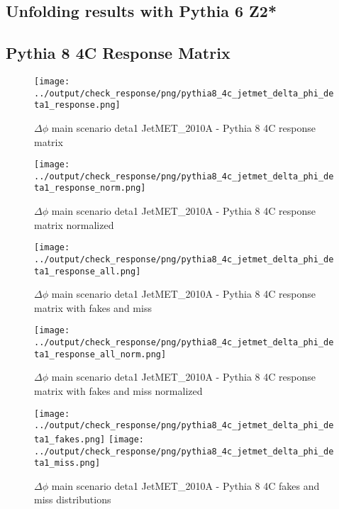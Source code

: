 \documentclass[11pt]{book}
\begin{document}
\clearpage
\subsection{Unfolding results with Pythia 6 Z2*}


\clearpage
\subsection{Pythia 8 4C Response Matrix}


\begin{figure}[ht]
\centering
\texttt{[image: ../output/check\_response/png/pythia8\_4c\_jetmet\_delta\_phi\_deta1\_response.png]}
\caption{$\Delta\phi$ main scenario deta1 JetMET\_2010A - Pythia 8 4C response matrix}
\label{p8_jetmet_response}
\end{figure}

\begin{figure}[ht]
\centering
\texttt{[image: ../output/check\_response/png/pythia8\_4c\_jetmet\_delta\_phi\_deta1\_response\_norm.png]}
\caption{$\Delta\phi$ main scenario deta1 JetMET\_2010A - Pythia 8 4C response matrix normalized}
\label{p8_jetmet_delta_phi_deta1_response_norm}
\end{figure}

\begin{figure}[ht]
\centering
\texttt{[image: ../output/check\_response/png/pythia8\_4c\_jetmet\_delta\_phi\_deta1\_response\_all.png]}
\caption{$\Delta\phi$ main scenario deta1 JetMET\_2010A - Pythia 8 4C response matrix with fakes and miss}
\label{p8_jetmet_delta_phi_deta1_response_all}
\end{figure}

\begin{figure}[ht]
\centering
\texttt{[image: ../output/check\_response/png/pythia8\_4c\_jetmet\_delta\_phi\_deta1\_response\_all\_norm.png]}
\caption{$\Delta\phi$ main scenario deta1 JetMET\_2010A - Pythia 8 4C response matrix with fakes and miss normalized}
\label{p8_jetmet_delta_phi_deta1_response_all_norm}
\end{figure}

\begin{figure}[ht]
\centering
\texttt{[image: ../output/check\_response/png/pythia8\_4c\_jetmet\_delta\_phi\_deta1\_fakes.png]}
\texttt{[image: ../output/check\_response/png/pythia8\_4c\_jetmet\_delta\_phi\_deta1\_miss.png]}
\caption{$\Delta\phi$ main scenario deta1 JetMET\_2010A - Pythia 8 4C fakes and miss distributions}
\label{p8_jetmet_delta_phi_deta1_fakesmiss}
\end{figure}
\end{document}
